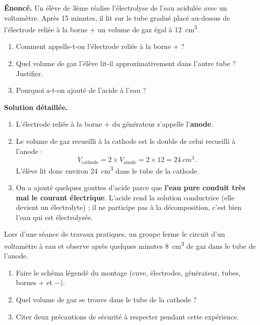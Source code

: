 \documentclass[11pt]{article}
\begin{document}
\begin{exoresolu}
\textbf{Énoncé.} Un élève de 3ème réalise l'électrolyse de l'eau acidulée avec un voltamètre. Après 15 minutes, il lit sur le tube gradué placé au-dessus de l'électrode reliée à la borne $+$ un volume de gaz égal à \SI{12}{cm^3}.
\begin{enumerate}
\item Comment appelle-t-on l'électrode reliée à la borne $+$ ?
\item Quel volume de gaz l'élève lit-il approximativement dans l'autre tube ? Justifier.
\item Pourquoi a-t-on ajouté de l'acide à l'eau ?
\end{enumerate}
\tcblower
\textbf{Solution détaillée.}
\begin{enumerate}
\item L'électrode reliée à la borne $+$ du générateur s'appelle l'\textbf{anode}.
\item Le volume de gaz recueilli à la cathode est le double de celui recueilli à l'anode :
\[ V_{\text{cathode}} = 2 \times V_{\text{anode}} = 2 \times 12 = \SI{24}{cm^3}. \]
L'élève lit donc environ \SI{24}{cm^3} dans le tube de la cathode.
\item On a ajouté quelques gouttes d'acide parce que \textbf{l'eau pure conduit très mal le courant électrique}. L'acide rend la solution conductrice (elle devient un électrolyte) ; il ne participe pas à la décomposition, c'est bien l'eau qui est électrolysée.
\end{enumerate}
\end{exoresolu}

\begin{exercice}
Lors d'une séance de travaux pratiques, un groupe ferme le circuit d'un voltamètre à eau et observe après quelques minutes \SI{8}{cm^3} de gaz dans le tube de l'anode.
\begin{enumerate}
\item Faire le schéma légendé du montage (cuve, électrodes, générateur, tubes, bornes $+$ et $-$).
\item Quel volume de gaz se trouve dans le tube de la cathode ?
\item Citer deux précautions de sécurité à respecter pendant cette expérience.
\end{enumerate}
\end{exercice}
\end{document}
